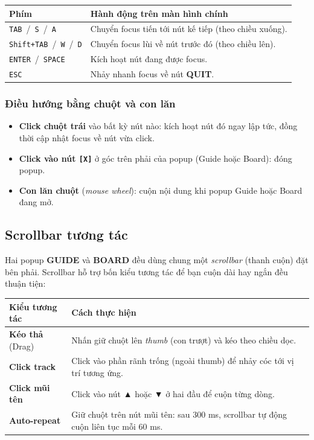 \documentclass[12pt,a4paper]{article}
\begin{document}
\vspace{4pt}
\begin{tabularx}{\linewidth}{|l|X|}
    \hline
    \textbf{Phím} & \textbf{Hành động trên màn hình chính} \\
    \hline
    \texttt{TAB} \,/\, \texttt{S} \,/\, \texttt{A}                & Chuyển focus tiến tới nút kế tiếp (theo chiều xuống). \\
    \hline
    \texttt{Shift+TAB} \,/\, \texttt{W} \,/\, \texttt{D}          & Chuyển focus lùi về nút trước đó (theo chiều lên). \\
    \hline
    \texttt{ENTER} \,/\, \texttt{SPACE}                            & Kích hoạt nút đang được focus. \\
    \hline
    \texttt{ESC}                                                    & Nhảy nhanh focus về nút \textbf{QUIT}. \\
    \hline
\end{tabularx}

\subsubsection{Điều hướng bằng chuột và con lăn}
\begin{itemize}
    \item \textbf{Click chuột trái} vào bất kỳ nút nào: kích hoạt nút đó ngay lập tức, đồng thời cập nhật focus về nút vừa click.
    \item \textbf{Click vào nút \texttt{[X]}} ở góc trên phải của popup (Guide hoặc Board): đóng popup.
    \item \textbf{Con lăn chuột} (\textit{mouse wheel}): cuộn nội dung khi popup Guide hoặc Board đang mở.
\end{itemize}

\subsection{Scrollbar tương tác}
Hai popup \textbf{GUIDE} và \textbf{BOARD} đều dùng chung một \textit{scrollbar} (thanh cuộn) đặt bên phải.
Scrollbar hỗ trợ bốn kiểu tương tác để bạn cuộn dài hay ngắn đều thuận tiện:

\vspace{4pt}
\begin{tabularx}{\linewidth}{|l|X|}
    \hline
    \textbf{Kiểu tương tác} & \textbf{Cách thực hiện} \\
    \hline
    \textbf{Kéo thả} (Drag)         & Nhấn giữ chuột lên \textit{thumb} (con trượt) và kéo theo chiều dọc. \\
    \hline
    \textbf{Click track}            & Click vào phần rãnh trống (ngoài thumb) để nhảy cóc tới vị trí tương ứng. \\
    \hline
    \textbf{Click mũi tên}          & Click vào nút ▲ hoặc ▼ ở hai đầu để cuộn từng dòng. \\
    \hline
    \textbf{Auto-repeat}            & Giữ chuột trên nút mũi tên: sau 300 ms, scrollbar tự động cuộn liên tục mỗi 60 ms. \\
    \hline
\end{tabularx}
\end{document}
